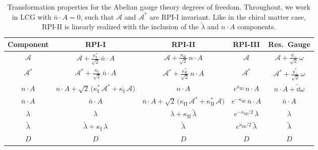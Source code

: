 \documentclass[12pt,document,nofootinbib,superscriptaddress,onecolumn,preprintnumbers,balancelastpage]{article}
\newcommand{\rpii}{{\kappa_\text{I}}}
\newcommand{\rpiii}{{\kappa_\text{II}}}
\newcommand{\rpiiii}{{\kappa_\text{III}}}
\newcommand{\rpiiC}{{\kappa^*_\text{I}}}
\newcommand{\rpiiiC}{{\kappa^*_\text{II}}}
\newcommand{\PP}{\mathbb{d}}
\newcommand{\alc}{\mathcal{A}}
\begin{document}
\begin{spacing}{1.2}
\begin{table}[t]
\renewcommand{\arraystretch}{1.8}
\setlength{\arrayrulewidth}{.3mm}
\small
\setlength{\tabcolsep}{0.45 em}
% 
\hspace{-5pt}
\begin{tabular}{ |c || c | c | c  | c|}
    \hline
    Component &  RPI-I &  RPI-II &   RPI-III& Res.~Gauge   \\
    \hline 
    \hline
 $\alc  $ &  $\alc+\frac{\rpiiC}{\sqrt{2}} \,\bar n \cdot A$     &   $\alc +\frac{\rpiii}{\sqrt{2}}  \, n \cdot A$ &    $\alc$  & $\alc +  \frac{\PP_\perp}{\sqrt{2}}  \, \omega $\\
 $\alc^*  $ &  $\alc^*+\frac{\rpii}{\sqrt{2}}  \, \bar n\cdot A$  &   $\alc^* + \frac{\rpiiiC}{\sqrt{2}}\, n\cdot A$ &   $\alc^*$  & $\alc^* + \frac{\PP_\perp^*}{\sqrt{2}}  \, \omega$ \\
 $n\cdot A  $ &    $n \cdot A + \sqrt{2}\,\big(\rpiiC\, \alc^* + \rpii\, \alc\big)$  &   $n\cdot A  $ &    $e^{\rpiiii}\, n\cdot A$  & $n \cdot A +  \tilde{\PP} \omega$ \\ 
 $\bar{n}\cdot A  $ &    $\bar{n}\cdot A$  &   $\bar{n}\cdot A + \sqrt{2}\,\big(\rpiii\, \alc^* + \rpiiiC\, \alc\big)$ &    $e^{-\rpiiii} \,\bar{n}\cdot A$  & $\bar{n}\cdot A$ \\ 
 \hline
       $\lambda  $ &  $\lambda $     &   $ \lambda + \rpiii \,\tilde{\lambda}$ &    $e^{-\rpiiii/2}\, \lambda$  & $\lambda$\\
 $\tilde{\lambda} $ &  $\tilde{\lambda}  + \rpii \,\lambda$     &   $\tilde{\lambda}$ &    $e^{\rpiiii/2}\, \tilde{\lambda}$  & $\tilde{\lambda} $\\
 \hline
 $D  $ &    $D$  &   $D$ &    $D$  & $D$ \\ \hline 
\end{tabular}
\caption{
%
Transformation properties for the Abelian gauge theory degrees of freedom.
%
Throughout, we work in LCG with $\bar{n}\cdot A = 0$, such that $\alc$ and $\alc^*$ are RPI-I invariant.
%
Like in the chiral matter case, RPI-II is linearly realized with the inclusion of the $\tilde{\lambda}$ and $n\cdot A$ components.
%
}
\label{table:RPIfieldsGauge}
\end{table}



\end{spacing}
\end{document}
